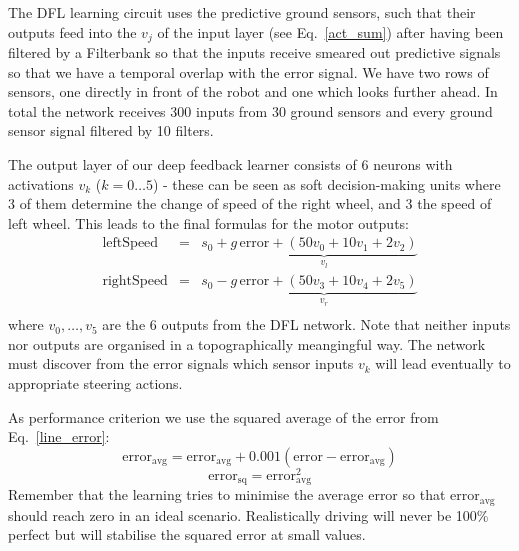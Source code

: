 \documentclass{llncs}
\begin{document}
The DFL learning circuit uses the predictive ground sensors, such that
their outputs feed into the $v_j$ of the input layer (see
Eq.~\ref{act_sum}) after having been filtered by a Filterbank so that
the inputs receive smeared out predictive signals so that we have a
temporal overlap with the error signal. We have two rows of sensors,
one directly in front of the robot and one which looks further ahead.
In total the network receives 300 inputs from 30 ground sensors and
every ground sensor signal filtered by 10 filters.

The output layer of our deep feedback learner consists of 6 neurons
with activations $v_k$ ($k=0 \ldots 5$) - these can be seen as soft
decision-making units where 3 of them determine the change of speed of
the right wheel, and 3 the speed of left wheel. This leads to the
final formulas for the motor outputs:
\begin{eqnarray}
  \mathrm{leftSpeed} &=& s_0 + \underbrace{g\, \mathrm{error} + \left( 50 v_0 + 10 v_1 + 2 v_2 \right)}_{v_l} \\
  \mathrm{rightSpeed} &=& s_0 - \underbrace{g\, \mathrm{error} + \left( 50 v_3 + 10 v_4 + 2 v_5 \right)}_{v_r} \\
\end{eqnarray}
where $v_0, \ldots, v_5$ are the 6 outputs from the DFL network. Note
that neither inputs nor outputs are organised in a topographically
meangingful way. The network must discover from the error signals
which sensor inputs $v_k$ will lead eventually to appropriate steering
actions.

As performance criterion we use the squared average of the error from
Eq.~\ref{line_error}:
\begin{equation}
  \mathrm{error}_\mathrm{avg} =  \mathrm{error}_\mathrm{avg} + 0.001 (\mathrm{error} - \mathrm{error}_\mathrm{avg}) 
\end{equation}
\begin{equation}
  \mathrm{error}_\mathrm{sq} =  \mathrm{error}_\mathrm{avg}^2 \label{line_sqerr}
\end{equation}
Remember that the learning tries to minimise the average error so that
$\mathrm{error}_\mathrm{avg}$ should reach zero in an ideal
scenario. Realistically driving will never be 100\% perfect but
will stabilise the squared error at small values.
\end{document}
